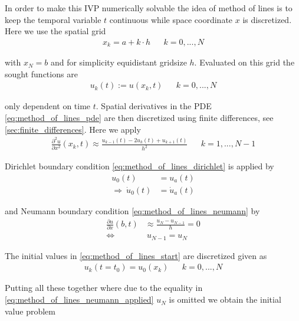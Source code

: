 \documentclass{scrartcl}[12pt, halfparskip]
\numberwithin{equation}{section}
\numberwithin{figure}{section}
\numberwithin{table}{section}
\begin{document}
In order to make this IVP numerically solvable the idea of method of lines is to keep the temporal variable $t$ continuous while space coordinate $x$ is discretized. Here we use the spatial grid
\begin{align}
	x_k = a + k \cdot h & & k=0,...,N
\end{align}

with $x_{N} = b$ and for simplicity equidistant gridsize $h$. Evaluated on this grid the sought functions are
\begin{align}
	u_k(t) := u(x_k,t) & & k=0,...,N
\end{align}

only dependent on time $t$. Spatial derivatives in the PDE \eqref{eq:method_of_lines_pde} are then discretized using finite differences, see \cref{sec:finite_differences}. Here we apply
\begin{align}
	\frac{\partial^2 u}{\partial x^2}(x_k,t) \approx \frac{u_{k-1}(t) - 2 u_k(t) + u_{k+1}(t)}{h^2} & & k=1,...,N-1
	\label{eq:discretized_second_derivative}
\end{align}

Dirichlet boundary condition \cref{eq:method_of_lines_dirichlet} is applied by
\begin{align}
	u_0(t) & = u_a(t) \\
	\Rightarrow \ \dot{u}_0(t) & = \dot{u}_a(t)
\end{align}

and Neumann boundary condition \cref{eq:method_of_lines_neumann} by
\begin{align}
	\frac{\partial u}{\partial x}(b,t) & \approx \frac{u_{N} - u_{N-1}}{h} = 0 \nonumber \\
	\Leftrightarrow & \ u_{N-1} = u_{N} \label{eq:method_of_lines_neumann_applied}
\end{align}

The initial values in \cref{eq:method_of_lines_start} are discretized given as
\begin{align}
	u_k(t=t_0) = u_0(x_k) & & k = 0,...,N
\end{align}

Putting all these together where due to the equality in \cref{eq:method_of_lines_neumann_applied} $u_{N}$ is omitted we obtain the initial value problem 
\end{document}

